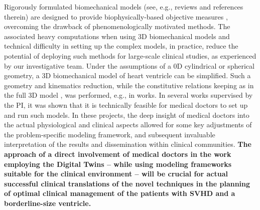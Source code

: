 Rigorously formulated biomechanical models (see, e.g.,  reviews \cite{chabiniok16,wang2015_review} and references therein) are  designed to provide biophysically-based objective measures \cite{wang2009modelling,xi2013estimation,hadjicharalambous17,chabiniok12,asner15}, overcoming the drawback of phenomenologically motivated methods.
The associated heavy computations when using 3D biomechanical models  and technical difficulty in setting up the complex models, in practice, reduce the potential of deploying such methods for large-scale clinical studies, as experienced by our investigative team\cite{sermesant12,chabiniok_BMMB2012,pfaller19a}. 
Under the assumptions of a 0D cylindrical or spherical geometry, a 3D biomechanical model of heart ventricle can be simplified. Such a geometry and kinematics reduction, while the constitutive relations keeping as in the full 3D model \cite{chapelle_energy-preserving_2012}, was performed, e.g., in works\cite{genet2023_cylindricalModel,caruel13,chabiniok22_poro}. 
In several works supervised by the PI, it was shown that it is technically feasible for  medical doctors to set up and run such models\cite{ruijsink20,ruijsink_FIMH2019,legall20,legall19,waugh_FIMH2021}. In these projects, the deep insight of medical doctors into the actual physiological and clinical aspects allowed for some key adjustments of the problem-specific modeling framework, and  subsequent invaluable interpretation of the results and dissemination within clinical communities. \textbf{The approach of a direct involvement of medical doctors in the work employing the Digital Twins -- while using modeling frameworks suitable for the clinical environment -- will be crucial for actual successful clinical translations of the novel techniques in the planning of optimal clinical management of the patients with SVHD and a borderline-size ventricle. } 


